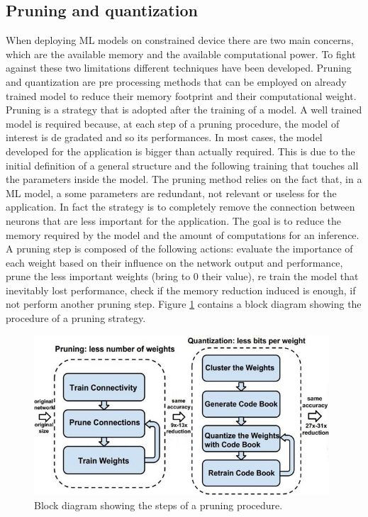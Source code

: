 \documentclass[12pt]{report}
\begin{document}
\subsection{Pruning and quantization}
When deploying ML models on constrained device there are two main concerns, which are the available memory and the available computational power. To fight against these two limitations different techniques have been developed. Pruning and quantization are pre processing methods that can be employed on already trained model to reduce their memory footprint and their computational weight. \\
Pruning is a strategy that is adopted after the training of a model. A well trained model is required because, at each step of a pruning procedure, the model of interest is de gradated and so its performances. In most cases, the model developed for the application is bigger than actually required. This is due to the initial definition of a general structure and the following training that touches all the parameters inside the model. The pruning method relies on the fact that, in a ML model, a some parameters are redundant, not relevant or useless for the application. In fact the strategy is to completely remove the connection between neurons that are less important for the application. The goal is to reduce the memory required by the model and the amount of computations for an inference. 
A pruning step is composed of the following actions: evaluate the importance of each weight based on their influence on the network output and performance, prune the less important weights (bring to 0 their value), re train the model that inevitably lost performance, check if the memory reduction induced is enough, if not perform another pruning step. Figure \ref{fig:pruning} contains a block diagram showing the procedure of a pruning strategy.

\begin{figure}[h!]
    \centering
    \includegraphics[width=110mm]{Figures/Chapter1/pruning.jpg} 
    \caption{Block diagram showing the steps of a pruning procedure.}
    \label{fig:pruning}    
\end{figure}  
\end{document}
